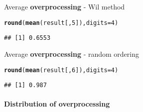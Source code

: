 \documentclass{article}\usepackage[]{graphicx}\usepackage[]{color}
\makeatletter
\newcommand{\hlnum}[1]{\textcolor[rgb]{0.686,0.059,0.569}{#1}}%
\newcommand{\hlstd}[1]{\textcolor[rgb]{0.345,0.345,0.345}{#1}}%
\newcommand{\hlkwc}[1]{\textcolor[rgb]{0.333,0.667,0.333}{#1}}%
\newcommand{\hlkwd}[1]{\textcolor[rgb]{0.737,0.353,0.396}{\textbf{#1}}}%
\newenvironment{kframe}{%
 \def\at@end@of@kframe{}%
 \ifinner\ifhmode%
  \def\at@end@of@kframe{\end{minipage}}%
  \begin{minipage}{\columnwidth}%
 \fi\fi%
 \def\FrameCommand##1{\hskip\@totalleftmargin \hskip-\fboxsep
 \colorbox{shadecolor}{##1}\hskip-\fboxsep
     \hskip-\linewidth \hskip-\@totalleftmargin \hskip\columnwidth}%
 \MakeFramed {\advance\hsize-\width
   \@totalleftmargin\z@ \linewidth\hsize
   \@setminipage}}%
 {\par\unskip\endMakeFramed%
 \at@end@of@kframe}
\newenvironment{knitrout}{}{} %
\makeatother
\begin{document}
Average \textbf{overprocessing} - Wil method

\begin{knitrout}
\color{fgcolor}\begin{kframe}
\begin{alltt}
\hlkwd{round}\hlstd{(}\hlkwd{mean}\hlstd{(result[,}\hlnum{5}\hlstd{]),}\hlkwc{digits} \hlstd{=} \hlnum{4}\hlstd{)}
\end{alltt}
\begin{verbatim}
## [1] 0.6553
\end{verbatim}
\end{kframe}
\end{knitrout}

Average \textbf{overprocessing} - random ordering

\begin{knitrout}
\color{fgcolor}\begin{kframe}
\begin{alltt}
\hlkwd{round}\hlstd{(}\hlkwd{mean}\hlstd{(result[,}\hlnum{6}\hlstd{]),}\hlkwc{digits} \hlstd{=} \hlnum{4}\hlstd{)}
\end{alltt}
\begin{verbatim}
## [1] 0.987
\end{verbatim}
\end{kframe}
\end{knitrout}

\paragraph{Distribution of overprocessing}
\end{document}
